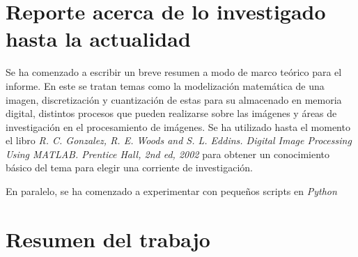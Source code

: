 







\newpage


\section{Reporte acerca de lo investigado hasta la actualidad}

Se ha comenzado a escribir un breve resumen a modo de marco teórico para el informe. En este se tratan temas como la modelización matemática de una imagen, discretización y cuantización de estas para su almacenado en memoria digital, distintos procesos que pueden realizarse sobre las imágenes y áreas de investigación en el procesamiento de imágenes. Se ha utilizado hasta el momento el libro \textit{R. C. Gonzalez, R. E. Woods and S. L. Eddins. Digital Image Processing Using MATLAB. Prentice Hall, 2nd ed, 2002} para obtener un conocimiento básico del tema para elegir una corriente de investigación.

En paralelo, se ha comenzado a experimentar con pequeños scripts en \textit{Python} 

\section{Resumen del trabajo}





